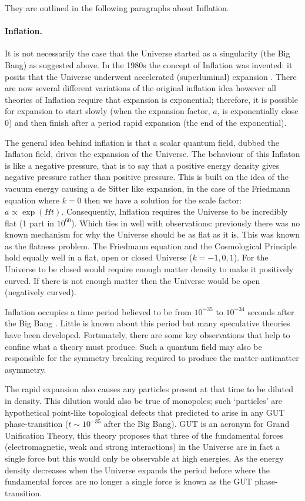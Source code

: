 \noindent They are outlined in the following paragraphs about Inflation.

\paragraph{Inflation.}
It is not necessarily the case that the Universe started as a singularity (the Big Bang) as suggested above. In the 1980s the concept of Inflation was invented: it posits that the Universe underwent accelerated (superluminal) expansion \citep{bib_baum}. There are now several different variations of the original inflation idea however all theories of Inflation require that expansion is exponential; therefore, it is possible for expansion to start slowly (when the expansion factor, $a$, is exponentially close 0) and then finish after a period rapid expansion (the end of the exponential). \citep{bib_pea}

The general idea behind inflation is that a scalar quantum field, dubbed the Inflaton field, drives the expansion of the Universe. The behaviour of this Inflaton is like a negative pressure, that is to say that a positive energy density gives negative pressure rather than positive pressure. This is built on the idea of the vacuum energy causing a de Sitter like expansion, in the case of the Friedmann equation where $k=0$ then we have a solution for the scale factor: $a \propto \exp(Ht)$. Consequently, Inflation requires the Universe to be incredibly flat (1 part in $10^{60}$). Which ties in well with observations: previously there was no known mechanism for why the Universe should be as flat as it is. This was known as the flatness problem. The Friedmann equation and the Cosmological Principle hold equally well in a flat, open or closed Universe ($k = -1, 0, 1 $). For the Universe to be closed would require enough matter density to make it positively curved. If there is not enough matter then the Universe would be open (negatively curved).

Inflation occupies a time period believed to be from $10^{-35}$ to $10^{-34}$ seconds after the Big Bang \citep{bib_pea}. Little is known about this period but many speculative theories have been developed. Fortunately, there are some key observations that help to confine what a theory must produce. Such a quantum field may also be responsible for the symmetry breaking required to produce the matter-antimatter asymmetry.

The rapid expansion also causes any particles present at that time to be diluted in density. This dilution would also be true of monopoles; such `particles' are hypothetical point-like topological defects that predicted to arise in any GUT phase-transition ($t\sim 10^{-35}$ after the Big Bang). GUT is an acronym for Grand Unification Theory, this theory proposes that three of the fundamental forces (electromagnetic, weak and strong interactions) in the Universe are in fact a single force but this would only be observable at high energies. As the energy density decreases when the Universe expands the period before where the fundamental forces are no longer a single force is known as the GUT phase-transition.

